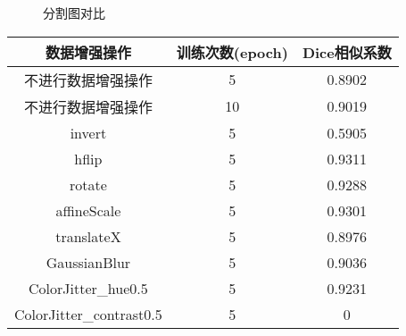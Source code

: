 \documentclass[AutoFakeBold]{LZUThesis}
\begin{document}
\begin{figure}[htbp]
    \centering
    \quad
    \centering
    \caption{分割图对比}
    \label{mask_compare}
\end{figure}

\begin{tabular}{|c|c|c|}
    \hline
    数据增强操作             & 训练次数(epoch) & Dice相似系数 \\
    \hline
    不进行数据增强操作       & 5               & 0.8902       \\
    \hline
    不进行数据增强操作       & 10              & 0.9019       \\
    \hline
    invert                   & 5               & 0.5905       \\
    \hline
    hflip                    & 5               & 0.9311       \\
    \hline
    rotate                   & 5               & 0.9288       \\
    \hline
    affineScale              & 5               & 0.9301       \\
    \hline
    translateX               & 5               & 0.8976       \\
    \hline
    GaussianBlur             & 5               & 0.9036       \\
    \hline
    ColorJitter\_hue0.5      & 5               & 0.9231       \\
    \hline
    ColorJitter\_contrast0.5 & 5               & 0            \\
\end{tabular}
\end{document}
